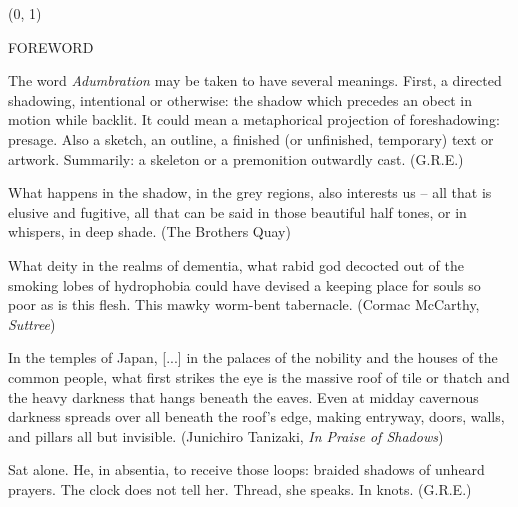 \documentclass[11pt]{article}
\begin{document}
\begin{textblock}{23}(0, 1)
\begin{center}
\huge FOREWORD
\end{center}
\end{textblock}

\vspace*{0.15\baselineskip}

\begingroup
\begin{center}
The word \textit{Adumbration} may be taken to have several meanings. First, a directed shadowing, intentional or otherwise: the shadow which precedes an obect in motion while backlit. It could mean a metaphorical projection of foreshadowing: presage. Also a sketch, an outline, a finished (or unfinished, temporary) text or artwork. Summarily: a skeleton or a premonition outwardly cast.
\rightskip\leftskip
\phantom{text} \hfill (G.R.E.)
\end{center}
\endgroup

\begingroup
\begin{center}
What happens in the shadow, in the grey regions, also interests us -- all that is elusive and fugitive, all that can be said in those beautiful half tones, or in whispers, in deep shade.
\rightskip\leftskip
\phantom{text} \hfill (The Brothers Quay)
\end{center}
\endgroup

\begingroup
\begin{center}
What deity in the realms of dementia, what rabid god decocted out of the smoking lobes of hydrophobia could have devised a keeping place for souls so poor as is this flesh. This mawky worm-bent tabernacle.
\rightskip\leftskip
\phantom{text} \hfill (Cormac McCarthy, \textit{Suttree})
\end{center}
\endgroup

\begingroup
\begin{center}
In the temples of Japan, [...] in the palaces of the nobility and the houses of the common people, what first strikes the eye is the massive roof of tile or thatch and the heavy darkness that hangs beneath the eaves. Even at midday cavernous darkness spreads over all beneath the roof's edge, making entryway, doors, walls, and pillars all but invisible. 
\rightskip\leftskip
\phantom{text} \hfill (Junichiro Tanizaki, \textit{In Praise of Shadows})
\end{center}
\endgroup

\begingroup
\begin{center}
Sat alone. He, in absentia, to receive those loops: braided shadows of unheard prayers. The clock does not tell her. Thread, she speaks. In knots.
\rightskip\leftskip
\phantom{text} \hfill (G.R.E.)
\end{center}
\endgroup
\end{document}
